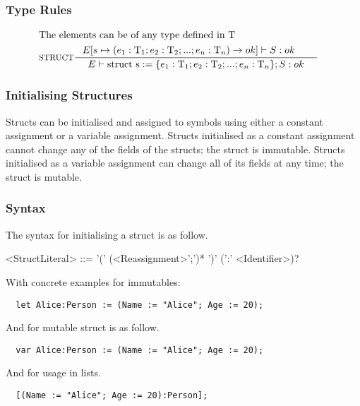 \subsubsection{Type Rules}

\begin{align*}
\intertext{The elements can be of any type defined in $\Tt$}
&\inference[STRUCT]{E[s \mapsto (e_1:\Tt_1;e_2:\Tt_2;...;e_n:\Tt_n) \rightarrow ok]\vdash S : ok & }
                 {\Tenv \mathbin{\text{struct s}} := \{e_1:\Tt_1;e_2:\Tt_2;...;e_n:\Tt_n\}; S: ok}
\end{align*}



\subsubsection{Initialising Structures}
\label{sec:initStructures}

Structs can be initialised and assigned to symbols using either a constant assignment or a variable assignment. Structs initialised as a constant assignment cannot change any of the fields of the structs; the struct is immutable. Structs initialised as a variable assignment can change all of its fields at any time; the struct is mutable.

\subsubsection{Syntax}

The syntax for initialising a struct is as follow.

\begin{grammar}
<StructLiteral> ::= '(' (<Reassignment>';')* ')' (':' <Identifier>)?
\end{grammar}


With concrete examples for immutables:

\begin{verbatim}
  let Alice:Person := (Name := "Alice"; Age := 20);
\end{verbatim}

And for mutable struct is as follow.

\begin{verbatim}
  var Alice:Person := (Name := "Alice"; Age := 20);
\end{verbatim}

And for usage in lists.

\begin{verbatim}
  [(Name := "Alice"; Age := 20):Person];
\end{verbatim}

